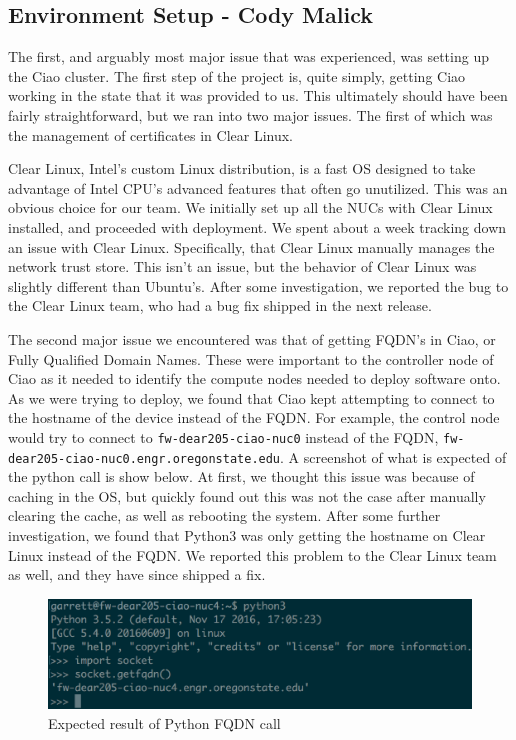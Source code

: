 \documentclass[10pt,onecolumn,journal,draftclsnofoot]{IEEEtran}
\begin{document}
\subsection{Environment Setup - Cody Malick}
The first, and arguably most major issue that was experienced, was setting up
the Ciao cluster. The first step of the project is, quite simply, getting Ciao
working in the state that it was provided to us. This ultimately should have
been fairly straightforward, but we ran into two major issues. The first of
which was the management of certificates in Clear Linux.

Clear Linux, Intel's custom Linux distribution, is a fast OS designed to take
advantage of Intel CPU's advanced features that often go unutilized. This was an
obvious choice for our team. We initially set up all the NUCs with Clear Linux
installed, and proceeded with deployment. We spent about a week tracking down an
issue with Clear Linux. Specifically, that Clear Linux manually manages the
network trust store. This isn't an issue, but the behavior of Clear Linux was
slightly different than Ubuntu's. After some investigation, we reported the bug
to the Clear Linux team, who had a bug fix shipped in the next release.

The second major issue we encountered was that of getting FQDN's in Ciao, or
Fully Qualified Domain Names. These were important to the controller node of
Ciao as it needed to identify the compute nodes needed to deploy software onto.
As we were trying to deploy, we found that Ciao kept attempting to connect to
the hostname of the device instead of the FQDN. For example, the control node
would try to connect to \texttt{fw-dear205-ciao-nuc0} instead of the FQDN,
\texttt{fw-dear205-ciao-nuc0.engr.oregonstate.edu}. A screenshot of what is
expected of the python call is show below. At first, we thought this issue was
because of caching in the OS, but quickly found out this was not the case after
manually clearing the cache, as well as rebooting the system.  After some
further investigation, we found that Python3 was only getting the hostname on
Clear Linux instead of the FQDN. We reported this problem to the Clear Linux
team as well, and they have since shipped a fix.

\begin{figure}[h]
	\caption{Expected result of Python FQDN call}
	\centering
	\includegraphics[scale=0.5]{getfqdn.eps}
\end{figure}
\end{document}
